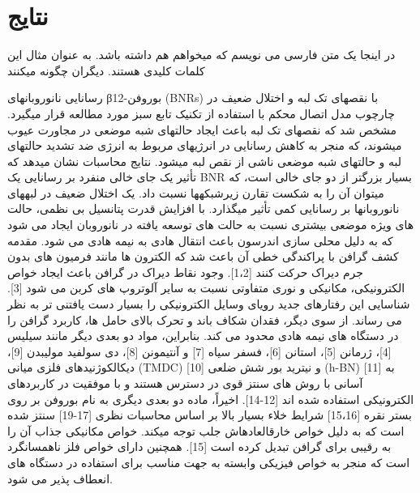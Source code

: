 \chapter{نتایج}
\clearpage
در اینجا یک متن فارسی می نویسم که میخواهم  هم داشته باشد.
به عنوان مثال این  کلمات کلیدی هستند.
دیگران چگونه  میکنند




% 
رسانایی نانوروبانهای β12-بوروفن (BNRs) با نقصهای تک لبه و اختلال ضعیف در چارچوب مدل اتصال محکم با استفاده از تکنیک تابع سبز مورد مطالعه قرار میگیرد. مشخص شد که نقصهای تک لبه باعث ایجاد حالتهای شبه موضعی در مجاورت عیوب میشوند، که منجر به کاهش رسانایی در انرژیهای مربوط به انرژی ضد تشدید حالتهای لبه و حالتهای شبه موضعی ناشی از نقص لبه میشود. نتایج محاسبات نشان میدهد که تأثیر یک جای خالی منفرد بر رسانایی یک BNR بسیار بزرگتر از دو جای خالی است، که میتوان آن را به شکست تقارن زیرشبکهها نسبت داد. یک اختلال ضعیف در لبههای نانوروبانها بر رسانایی کمی تأثیر میگذارد. با افزایش قدرت پتانسیل بی نظمی، حالت های ویژه موضعی بیشتری نسبت به حالت های توسعه یافته در نانوروبان ایجاد می شود که به دلیل محلی سازی اندرسون باعث انتقال هادی به نیمه هادی می شود.
مقدمه کشف گرافن با پراکندگی خطی آن باعث شد که الکترون ها مانند فرمیون های بدون جرم دیراک حرکت کنند [1،2]. وجود نقاط دیراک در گرافن باعث ایجاد خواص الکترونیکی، مکانیکی و نوری متفاوتی نسبت به سایر آلوتروپ های کربن می شود [3]. شناسایی این رفتارهای جدید رویای وسایل الکترونیکی را بسیار دست یافتنی تر به نظر می رساند. از سوی دیگر، فقدان شکاف باند و تحرک بالای حامل ها، کاربرد گرافن را در دستگاه های نیمه هادی محدود می کند. بنابراین، مواد دو بعدی دیگر مانند سیلیس [4]، ژرمانن [5]، استانن [6]، فسفر سیاه [7] و آنتیمونن [8]، دی سولفید مولیبدن [9]، دیکالکوژنیدهای فلزی میانی (TMDC) [10] و نیترید بور شش ضلعی (h-BN) [11] به آسانی با روش های سنتز قوی در دسترس هستند و با موفقیت در کاربردهای الکترونیکی استفاده شده اند [12-14]. اخیراً، ماده دو بعدی دیگری به نام بوروفن بر روی بستر نقره [15،16] شرایط خلاء بسیار بالا بر اساس محاسبات نظری [17-19] سنتز شده است که به دلیل خواص خارقالعادهاش جلب توجه میکند. خواص مکانیکی جذاب آن را به رقیبی برای گرافن تبدیل کرده است [15]. همچنین دارای خواص فلز ناهمسانگرد است که منجر به خواص فیزیکی وابسته به جهت مناسب برای استفاده در دستگاه های انعطاف پذیر می شود.
